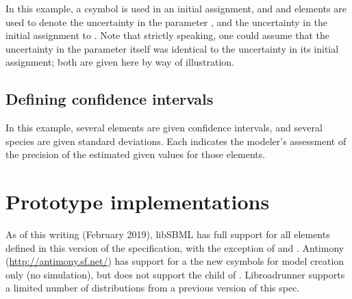 \documentclass[draftspec]{sbmlpkgspec}
\newcommand{\Distribution}{\defRef{Distribution}{Distribution-class}}
\begin{document}
In this example, a  csymbol is used in an initial assignment, and  and  elements are used to denote the uncertainty in the parameter , and the uncertainty in the initial assignment to .  Note that strictly speaking, one could assume that the uncertainty in the parameter itself was identical to the uncertainty in its initial assignment; both are given here by way of illustration.



\subsection{Defining confidence intervals }

In this example, several \Parameter elements are given confidence intervals, and several species are given standard deviations.  Each indicates the modeler's assessment of the precision of the estimated given values for those elements.  







\section{Prototype implementations}

As of this writing (February 2019), libSBML has full support for all elements defined in this version of the specification, with the exception of  and .  Antimony (\url{http://antimony.sf.net/}) has support for a the new csymbols for model creation only (no simulation), but does not support the  child of \SBase.  Libroadrunner supports a limited number of distributions from a previous version of this spec.

\end{document}
